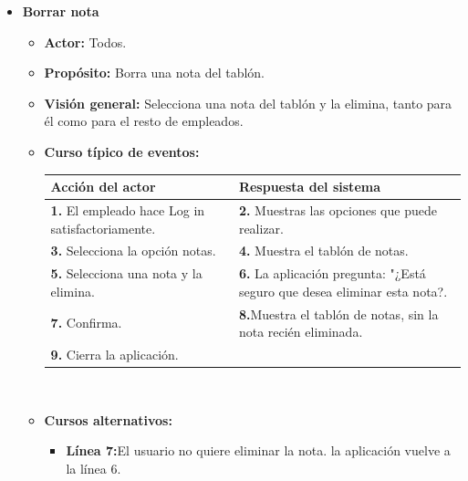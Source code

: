 \documentclass[spanish,a4paper,12pt]{report}		%
\begin{document}
\begin{itemize}
		\item \textbf{Borrar nota}
			\begin{itemize}
			\item \textbf{Actor:} Todos.
			\item \textbf{Propósito: } Borra una nota del tablón.
			\item \textbf{Visión general:} Selecciona una nota del tablón y la elimina, tanto para él como para el resto de empleados.
			\item \textbf{Curso típico de eventos:} 	\\
				\begin{tabular}{|p{6cm}||p{6cm}|}
				\hline
				\textbf{Acción del actor} & \textbf{Respuesta del sistema} \\ \hline \hline
				\textbf{1.}    El empleado hace Log in satisfactoriamente. & \textbf{2.} Muestras las opciones que puede realizar. \\ \hline
				\textbf{3.} Selecciona la opción notas. & \textbf{4.} Muestra el tablón de notas. \\ \hline
				\textbf{5.} Selecciona una nota y la elimina.	& \textbf{6.} La aplicación pregunta: "¿Está seguro que desea eliminar esta nota?. \\ \hline
				\textbf{7.} Confirma.	& \textbf{8.}Muestra el tablón de notas, sin la nota recién eliminada. \\ \hline
				\textbf{9.} Cierra la aplicación. &  \\ \hline
			\end{tabular}
			\\
			\item \textbf{Cursos alternativos:} 
			\begin{itemize}
			\item  \textbf{Línea 7:}El usuario no quiere eliminar la nota. la aplicación vuelve a la línea 6.
			\end {itemize}
		\end {itemize}

	

\end{itemize}
\end{document}
